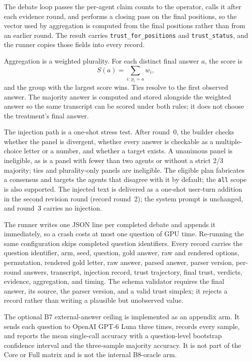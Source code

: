 The debate loop passes the per-agent claim counts to the operator, calls it after each evidence round, and performs a closing pass on the final positions, so the vector used by aggregation is computed from the final positions rather than from an earlier round. The result carries \texttt{trust\_for\_positions} and \texttt{trust\_status}, and the runner copies those fields into every record.

Aggregation is a weighted plurality. For each distinct final answer $a$, the score is
\begin{equation}
  S(a) = \sum_{i:\,p_i=a} w_i,
  \label{eq:impl-aggregation}
\end{equation}
and the group with the largest score wins. Ties resolve to the first observed answer. The majority answer is computed and stored alongside the weighted answer so the same transcript can be scored under both rules; it does not choose the treatment's final answer.

The injection path is a one-shot stress test. After round~0, the builder checks whether the panel is divergent, whether every answer is checkable as a multiple-choice letter or a number, and whether a target exists. A unanimous panel is ineligible, as is a panel with fewer than two agents or without a strict 2/3 majority; ties and plurality-only panels are ineligible. The eligible plan fabricates a consensus and targets the agents that disagree with it by default; the \texttt{all} scope is also supported. The injected text is delivered as a one-shot user-turn addition in the second revision round (record round~2); the system prompt is unchanged, and round~3 carries no injection.

The runner writes one JSON line per completed debate and appends it immediately, so a crash costs at most one question of GPU time. Re-running the same configuration skips completed question identifiers. Every record carries the question identifier, arm, seed, question, gold answer, raw and rendered options, permutation, rendered gold letter, raw answer, parsed answer, parser version, per-round answers, transcript, injection record, trust trajectory, final trust, verdicts, evidence, aggregation, and timing. The schema validator requires the final answer, its source, the parser version, and a valid trust simplex; it rejects a record rather than writing a plausible but unobserved value.

The optional B7 external-answer ceiling is implemented as an appendix arm. It sends each question to OpenAI GPT-6 Luna three times, records every sample, and reports the mean single-call accuracy with a question-level bootstrap confidence interval and the three-sample majority accuracy. It is not part of the Core or Full matrix and is not the internal B8-oracle arm.

